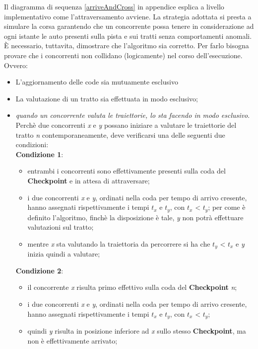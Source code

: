 Il diagramma di sequenza \ref{arriveAndCross} in appendice esplica a livello implementativo come l'attraversamento avviene.
La strategia adottata si presta a simulare la corsa garantendo che un concorrente possa tenere in considerazione ad
ogni istante le auto presenti sulla pista e sui tratti senza comportamenti
anomali. \`{E} necessario, tuttavita, dimostrare che l'algoritmo sia corretto. Per farlo bisogna provare che i concorrenti
non collidano (logicamente) nel corso dell'esecuzione. Ovvero:
\begin{itemize}
\item L'aggiornamento delle code sia mutuamente esclusivo
\item La valutazione di un tratto sia effettuata in modo esclusivo;
\end{itemize}
\begin{itemize}
\item \emph{quando un concorrente valuta le traiettorie, lo sta facendo in modo
esclusivo}.
Perchè due concorrenti \emph{x} e \emph{y} possano iniziare a valutare le traiettorie del tratto \emph{n}
contemporaneamente, deve verificarsi una delle seguenti due condizioni:\\
\textbf{Condizione 1}:
\begin{itemize}
\item entrambi i concorrenti sono effettivamente presenti sulla coda del \textbf{Checkpoint} e in attesa di attraversare;
\item i due concorrenti \emph{x} e \emph{y}, ordinati nella coda per tempo di arrivo cresente, hanno assegnati rispettivamente i tempi
\emph{$t_x$} e \emph{$t_y$}, con $t_x$ < $t_y$; per come è definito l'algoritmo, finchè la disposizione è tale, \emph{y} non potrà effettuare
valutazioni sul tratto;
\item mentre \emph{x} sta valutando la traiettoria da percorrere%
si ha che $t_y$ < $t_x$ e \emph{y} inizia quindi a valutare;
\end{itemize}
\textbf{Condizione 2}:
\begin{itemize}
\item il concorrente \emph{x} risulta primo effettivo sulla coda del \textbf{Checkpoint} \emph{n}; 
\item i due concorrenti \emph{x} e \emph{y}, ordinati nella coda per tempo di arrivo cresente, hanno assegnati rispettivamente i tempi
\emph{$t_x$} e \emph{$t_y$}, con $t_x$ < $t_y$; 
\item quindi \emph{y} risulta in posizione inferiore ad \emph{x} sullo stesso \textbf{Checkpoint}, ma non è effettivamente arrivato;

\end{itemize}
\end{itemize}

